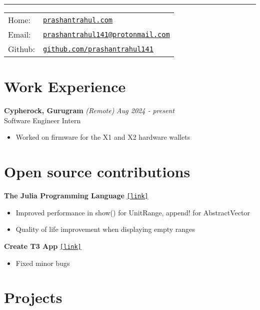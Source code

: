 \documentclass[a4paper,11pt]{article}
\begin{document}
 \vspace{0.5em}

\hrule\vspace{1em}

\noindent
\begin{tabular}{@{}l l}
Home: & \href{https://prashantrahul.com}{\texttt{prashantrahul.com}} \\
Email: & \href{mailto:prashantrahul141@protonmail.com}{\texttt{prashantrahul141@protonmail.com}} \\
Github: & \href{https://github.com/prashantrahul141}{\texttt{github.com/prashantrahul141}} \\
\end{tabular}

\section*{Work Experience}

\noindent\textbf{Cypherock, Gurugram} \textit{(Remote)} \hfill \textit{Aug 2024 - present}\\
\noindent Software Engineer Intern
\begin{itemize}[noitemsep, topsep=0pt]
    \item Worked on firmware for the X1 and X2 hardware wallets
\end{itemize}


\section*{Open source contributions}

\noindent\textbf{The Julia Programming Language} \hfill \texttt{\href{https://github.com/JuliaLang/julia/issues?q=author%3Aprashantrahul141}{[link]}} \\
\begin{itemize}[noitemsep, topsep=0pt]
    \item Improved performance in show() for UnitRange, append! for AbstractVector
    \item Quality of life improvement when displaying empty ranges
\end{itemize}

\noindent\textbf{Create T3 App} \hfill \texttt{\href{https://github.com/t3-oss/create-t3-app/pulls?q=is%3Apr+author%3Aprashantrahul141}{[link]}} \\
\begin{itemize}[noitemsep, topsep=0pt]
    \item Fixed minor bugs
\end{itemize}

\section*{Projects}
\end{document}
